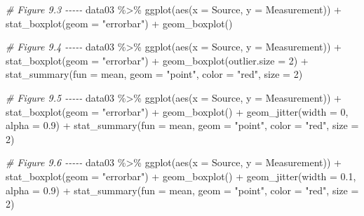 \documentclass[
]{book}
\newenvironment{Shaded}{\begin{snugshade}}{\end{snugshade}}
\newcommand{\AttributeTok}[1]{\textcolor[rgb]{0.77,0.63,0.00}{#1}}
\newcommand{\CommentTok}[1]{\textcolor[rgb]{0.56,0.35,0.01}{\textit{#1}}}
\newcommand{\DecValTok}[1]{\textcolor[rgb]{0.00,0.00,0.81}{#1}}
\newcommand{\FloatTok}[1]{\textcolor[rgb]{0.00,0.00,0.81}{#1}}
\newcommand{\FunctionTok}[1]{\textcolor[rgb]{0.00,0.00,0.00}{#1}}
\newcommand{\NormalTok}[1]{#1}
\newcommand{\SpecialCharTok}[1]{\textcolor[rgb]{0.00,0.00,0.00}{#1}}
\newcommand{\StringTok}[1]{\textcolor[rgb]{0.31,0.60,0.02}{#1}}
\begin{document}
\begin{Shaded}
\begin{Highlighting}[]
\CommentTok{\# Figure 9.3 {-}{-}{-}{-}{-}}
\NormalTok{data03 }\SpecialCharTok{\%\textgreater{}\%} \FunctionTok{ggplot}\NormalTok{(}\FunctionTok{aes}\NormalTok{(}\AttributeTok{x =}\NormalTok{ Source, }\AttributeTok{y =}\NormalTok{ Measurement)) }\SpecialCharTok{+} \FunctionTok{stat\_boxplot}\NormalTok{(}\AttributeTok{geom =} \StringTok{"errorbar"}\NormalTok{) }\SpecialCharTok{+} 
  \FunctionTok{geom\_boxplot}\NormalTok{()}

\CommentTok{\# Figure 9.4 {-}{-}{-}{-}{-}}
\NormalTok{data03 }\SpecialCharTok{\%\textgreater{}\%} \FunctionTok{ggplot}\NormalTok{(}\FunctionTok{aes}\NormalTok{(}\AttributeTok{x =}\NormalTok{ Source, }\AttributeTok{y =}\NormalTok{ Measurement)) }\SpecialCharTok{+} \FunctionTok{stat\_boxplot}\NormalTok{(}\AttributeTok{geom =} \StringTok{"errorbar"}\NormalTok{) }\SpecialCharTok{+}
  \FunctionTok{geom\_boxplot}\NormalTok{(}\AttributeTok{outlier.size =} \DecValTok{2}\NormalTok{) }\SpecialCharTok{+} 
  \FunctionTok{stat\_summary}\NormalTok{(}\AttributeTok{fun =}\NormalTok{ mean, }\AttributeTok{geom =} \StringTok{"point"}\NormalTok{, }\AttributeTok{color =} \StringTok{"red"}\NormalTok{, }\AttributeTok{size =} \DecValTok{2}\NormalTok{)}

\CommentTok{\# Figure 9.5 {-}{-}{-}{-}{-}}
\NormalTok{data03 }\SpecialCharTok{\%\textgreater{}\%} \FunctionTok{ggplot}\NormalTok{(}\FunctionTok{aes}\NormalTok{(}\AttributeTok{x =}\NormalTok{ Source, }\AttributeTok{y =}\NormalTok{ Measurement)) }\SpecialCharTok{+} \FunctionTok{stat\_boxplot}\NormalTok{(}\AttributeTok{geom =} \StringTok{"errorbar"}\NormalTok{) }\SpecialCharTok{+} 
  \FunctionTok{geom\_boxplot}\NormalTok{() }\SpecialCharTok{+} \FunctionTok{geom\_jitter}\NormalTok{(}\AttributeTok{width =} \DecValTok{0}\NormalTok{, }\AttributeTok{alpha =} \FloatTok{0.9}\NormalTok{) }\SpecialCharTok{+} 
  \FunctionTok{stat\_summary}\NormalTok{(}\AttributeTok{fun =}\NormalTok{ mean, }\AttributeTok{geom =} \StringTok{"point"}\NormalTok{, }\AttributeTok{color =} \StringTok{"red"}\NormalTok{, }\AttributeTok{size =} \DecValTok{2}\NormalTok{)}

\CommentTok{\# Figure 9.6 {-}{-}{-}{-}{-}}
\NormalTok{data03 }\SpecialCharTok{\%\textgreater{}\%} \FunctionTok{ggplot}\NormalTok{(}\FunctionTok{aes}\NormalTok{(}\AttributeTok{x =}\NormalTok{ Source, }\AttributeTok{y =}\NormalTok{ Measurement)) }\SpecialCharTok{+} \FunctionTok{stat\_boxplot}\NormalTok{(}\AttributeTok{geom =} \StringTok{"errorbar"}\NormalTok{) }\SpecialCharTok{+} 
  \FunctionTok{geom\_boxplot}\NormalTok{() }\SpecialCharTok{+} \FunctionTok{geom\_jitter}\NormalTok{(}\AttributeTok{width =} \FloatTok{0.1}\NormalTok{, }\AttributeTok{alpha =} \FloatTok{0.9}\NormalTok{) }\SpecialCharTok{+} 
  \FunctionTok{stat\_summary}\NormalTok{(}\AttributeTok{fun =}\NormalTok{ mean, }\AttributeTok{geom =} \StringTok{"point"}\NormalTok{, }\AttributeTok{color =} \StringTok{"red"}\NormalTok{, }\AttributeTok{size =} \DecValTok{2}\NormalTok{)}
\end{Highlighting}
\end{Shaded}
\end{document}
